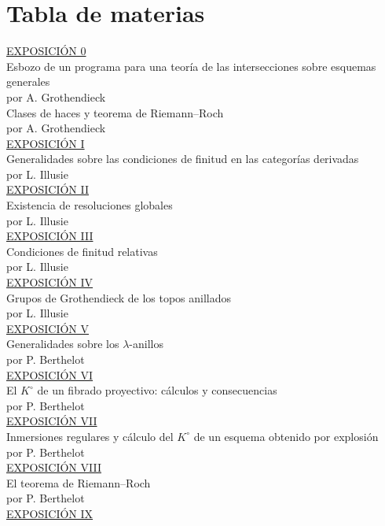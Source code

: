 \documentclass[11pt]{article}
\begin{document}
\section*{Tabla de materias}

\noindent
\underline{EXPOSICIÓN 0}\\
Esbozo de un programa para una teoría de las intersecciones sobre esquemas generales\\
por A. Grothendieck \\[8pt]
Clases de haces y teorema de Riemann--Roch\\
por A. Grothendieck \\[8pt]
\underline{EXPOSICIÓN I}\\
Generalidades sobre las condiciones de finitud en las categorías derivadas\\
por L. Illusie \\[8pt]
\underline{EXPOSICIÓN II}\\
Existencia de resoluciones globales\\
por L. Illusie \\[8pt]
\underline{EXPOSICIÓN III}\\
Condiciones de finitud relativas\\
por L. Illusie \\[8pt]
\underline{EXPOSICIÓN IV}\\
Grupos de Grothendieck de los topos anillados\\
por L. Illusie \\[8pt]
\underline{EXPOSICIÓN V}\\
Generalidades sobre los $\lambda$-anillos\\
por P. Berthelot \\[8pt]
\underline{EXPOSICIÓN VI}\\
El $K^\circ$ de un fibrado proyectivo: cálculos y consecuencias\\
por P. Berthelot \\[8pt]
\underline{EXPOSICIÓN VII}\\
Inmersiones regulares y cálculo del $K^\circ$ de un esquema obtenido por explosión\\
por P. Berthelot \\[8pt]
\underline{EXPOSICIÓN VIII}\\
El teorema de Riemann--Roch\\
por P. Berthelot \\[8pt]
\underline{EXPOSICIÓN IX}\\
\end{document}
